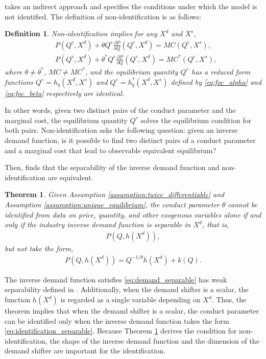\documentclass[11pt, a4paper]{article}
\newtheorem{theorem}{Theorem}
\newtheorem{definition}{Definition}
\theoremstyle{remark}
\begin{document}
\citet{lau1982identifying} takes an indirect approach and specifies the conditions under which the model is not identified.
The definition of non-identification is as follows:
\begin{definition}\label{def:non_identification}
    Non-identification implies for any $X^{d}$ and $X^{s}$,
    \begin{align}
    & P(Q^e, X^{d}) + \theta Q^e\frac{\partial P}{\partial Q}(Q^e, X^{d}) = MC(Q^e, X^{s}) ,  \label{eq:foc_alpha}\\
    & P(Q^e, X^{d}) + \theta^{*} Q^e\frac{\partial P}{\partial Q}(Q^e, X^{d}) = MC^{*}(Q^e, X^{s}),\label{eq:foc_beta}
    \end{align}
    where $\theta \neq \theta^{*}$, $MC \ne MC^{*}$, and the equilibrium quantity $Q^e$ has a reduced form functions $Q^e = h_q(X^{d}, X^{s})$ and $Q^e = h_q^{*}(X^{d}, X^{s})$ defined by \eqref{eq:foc_alpha} and \eqref{eq:foc_beta} respectively are identical.
\end{definition}
In other words, given two distinct pairs of the conduct parameter and the marginal cost, the equilibrium quantity $Q^e$ solves the equilibrium condition for both pairs.
Non-identification asks the following question: given an inverse demand function, is it possible to find two distinct pairs of a conduct parameter and a marginal cost that lead to observable equivalent equilibrium?

Then, \citet{lau1982identifying} finds that the separability of the inverse demand function and non-identification are equivalent.
\begin{theorem}\label{theorem_lau}
    Given Assumption \ref{assumption:twice_differentiable} and Assumption \ref{assumption:unique_equilibrium},
    the conduct parameter $\theta$ cannot be identified from data on price, quantity, and other exogenous variables alone if and only if the industry inverse demand function is separable in $X^{d}$, that is,
    \begin{align}
        P(Q, h(X^{d})), \label{eq:demand_separable}
    \end{align}
    but not take the form, 
    \begin{align}
        P(Q, h(X^{d})) = Q^{-1/\theta}h(X^{d}) + k(Q). \label{eq:identification_separable}
    \end{align}
\end{theorem}
The inverse demand function satisfies \eqref{eq:demand_separable} has weak separability defined in \citet{goldmanNote1964}.
Additionally, when the demand shifter is a scalar, the function $h(X^{d})$ is regarded as a single variable depending on $X^{d}$.
Thus, the theorem implies that when the demand shifter is a scalar, the conduct parameter can be identified only when the inverse demand function takes the form \eqref{eq:identification_separable}.
Because Theorem \ref{theorem_lau} derives the condition for non-identification, the shape of the inverse demand function and the dimension of the demand shifter are important for the identification.
\end{document}
